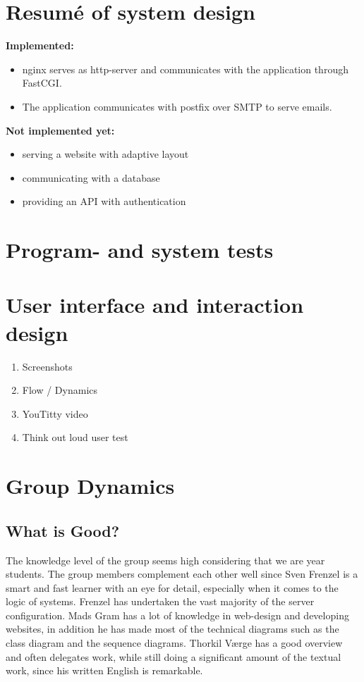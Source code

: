 \documentclass[11pt,a4paper]{report}
\begin{document}
\section{Resumé of system design}\label{sec:Systemdesign}
\textbf{Implemented:}
\begin{itemize}
\item nginx serves as http-server and communicates with the application
through FastCGI.
\item The application communicates with postfix over SMTP to serve emails.
\end{itemize}
\textbf{Not implemented yet:}
\begin{itemize}
    \item serving a website with adaptive layout
    \item communicating with a database
    \item providing an API with authentication
\end{itemize}


\section{Program- and system tests}\label{sec:Program_systemtests}

\section{User interface and interaction design}\label{sec:UI_interactiondesign}
\begin{enumerate}[label=(\alph*)]
\item Screenshots
\item Flow / Dynamics
\item YouTitty video
\item Think out loud user test
\end{enumerate}

\section{Group Dynamics}
\subsection{What is Good?}
The knowledge level of the group seems high considering that we are  year students. The group members complement each other well since Sven Frenzel is a smart and fast learner with an eye for detail, especially when it comes to the logic of systems. Frenzel has undertaken the vast majority of the server configuration. Mads Gram has a lot of knowledge in web-design and developing websites, in addition he has made most of the technical diagrams such as the class diagram and the sequence diagrams. Thorkil Værge has a good overview and often delegates work, while still doing a significant amount of the textual work, since his written English is remarkable.
\end{document}
